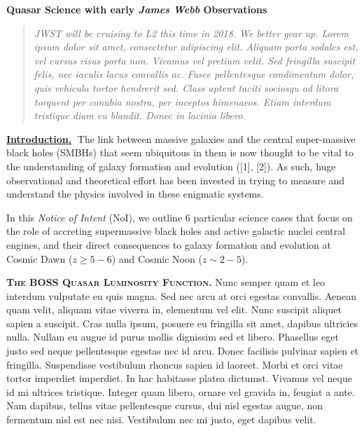 \documentclass[11pt,epsf]{article}
\begin{document}
\vspace{-44pt} 
\begin{center}
  {\Large \bf Quasar Science with early {\it James Webb} Observations}
\end{center}

\begin{quotation}
\noindent
{\it  JWST will be cruising to L2 this time in 2018. We better gear up. 
Lorem ipsum dolor sit amet, consectetur adipiscing elit. Aliquam porta
sodales est, vel cursus risus porta non. Vivamus vel pretium
velit. Sed fringilla suscipit felis, nec iaculis lacus convallis
ac. Fusce pellentesque condimentum dolor, quis vehicula tortor
hendrerit sed. Class aptent taciti sociosqu ad litora torquent per
conubia nostra, per inceptos himenaeos. Etiam interdum tristique diam
eu blandit. Donec in lacinia libero.}
\noindent
\end{quotation}

\smallskip
\smallskip
\noindent
{\bf \underline{Introduction.}$\;$}
The link between massive galaxies and the central super-massive black
holes (SMBHs) that seem ubiquitous in them is now thought to be vital
to the understanding of galaxy formation and evolution ([1], [2]).  As
such, huge observational and theoretical effort has been invested in
trying to measure and understand the physics involved in these
enigmatic systems. 


\smallskip
\smallskip
\noindent
In this {\it Notice of Intent} (NoI), we outline 6 particular science cases 
that focus on the role of accreting supermassive black holes and 
active galactic nuclei central engines, and their direct consequences 
to galaxy formation and evolution at Cosmic Dawn ($z\geq5-6$) and 
Cosmic Noon ($z\sim2-5$). 

\medskip

\smallskip
\noindent
\textbf{\textsc{The BOSS Quasar Luminosity Function.}} 
Nunc semper quam et leo interdum vulputate eu quis magna. Sed nec arcu
at orci egestas convallis. Aenean quam velit, aliquam vitae viverra
in, elementum vel elit. Nunc suscipit aliquet sapien a suscipit. Cras
nulla ipsum, posuere eu fringilla sit amet, dapibus ultricies
nulla. Nullam eu augue id purus mollis dignissim sed et
libero. Phasellus eget justo sed neque pellentesque egestas nec id
arcu. Donec facilisis pulvinar sapien et fringilla. Suspendisse
vestibulum rhoncus sapien id laoreet. Morbi et orci vitae tortor
imperdiet imperdiet. In hac habitasse platea dictumst. Vivamus vel
neque id mi ultrices tristique. Integer quam libero, ornare vel
gravida in, feugiat a ante. Nam dapibus, tellus vitae pellentesque
cursus, dui nisl egestas augue, non fermentum nisl est nec
nisi. Vestibulum nec mi justo, eget dapibus velit.
\end{document}
